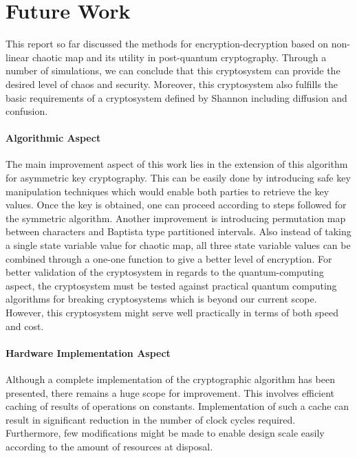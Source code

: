 \chapter{Future Work}
\label{chap:future}
\setlength{\parskip}{1.5mm}
This report so far discussed the methods for encryption-decryption based on non-linear chaotic map and its utility in post-quantum cryptography. Through a number of simulations, we can conclude that this cryptosystem can provide the desired level of chaos and security. Moreover, this cryptosystem also fulfills the basic requirements of a cryptosystem defined by Shannon including diffusion and confusion.
\subsubsection{Algorithmic Aspect}
The main improvement aspect of this work lies in the extension of this algorithm for asymmetric key cryptography. This can be easily done by introducing safe key manipulation techniques which would enable both parties to retrieve the key values. Once the key is obtained, one can proceed according to steps followed for the symmetric algorithm. Another improvement is introducing permutation map between characters and Baptista type partitioned intervals. Also instead of taking a single state variable value for chaotic map, all three state variable values can be combined through a one-one function to give a better level of encryption. For better validation of the cryptosystem in regards to the quantum-computing aspect, the cryptosystem must be tested against practical quantum computing algorithms for breaking cryptosystems which is beyond our current scope. However, this cryptosystem might serve well  practically in terms of both speed and cost.

\subsubsection{Hardware Implementation Aspect}
Although a complete implementation of the cryptographic algorithm has been presented, there remains a huge scope for improvement. This involves efficient caching of results of operations on constants. Implementation of such a cache can result in significant reduction in the number of clock cycles required. Furthermore, few modifications might be made to enable design scale easily according to the amount of resources at disposal.
